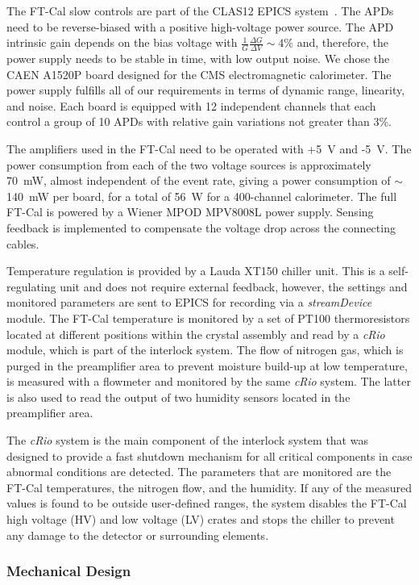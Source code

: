 The FT-Cal slow controls are part of the CLAS12 EPICS system~\cite{daq}. The APDs need to be reverse-biased
with a positive high-voltage power source. The APD intrinsic gain depends on the bias voltage with
$\frac{1}{G}\frac{\Delta G}{\Delta V} \sim4 \%$ and, therefore, the power supply needs to be stable in time, with
low output noise. We chose the CAEN A1520P board designed for the CMS electromagnetic calorimeter. The power
supply fulfills all of our requirements in terms of dynamic range, linearity, and noise. Each board is equipped with 12
independent channels that each control a group of 10 APDs with relative gain variations not greater than 3\%.

The amplifiers used in the FT-Cal need to be operated with +5~V and -5~V. The power consumption from each of the
two voltage sources is approximately 70~mW, almost independent of the event rate, giving a power consumption of
$\sim$140~mW per board, for a total of 56~W for a 400-channel calorimeter. The full FT-Cal is powered by a
Wiener MPOD MPV8008L power supply. Sensing feedback is implemented to compensate the voltage drop across the
connecting cables.

Temperature regulation is provided by a Lauda XT150 chiller unit. This is a self-regulating unit and does not require
external feedback, however, the settings and monitored parameters are sent to EPICS for recording via a
{\it streamDevice} module. The FT-Cal temperature is monitored by a set of PT100 thermoresistors located at
different positions within the crystal assembly and read by a {\it cRio} module, which is part of the interlock system.
The flow of nitrogen gas, which is purged in the preamplifier area to prevent moisture build-up at low temperature,
is measured with a flowmeter and monitored by the same {\it cRio} system. The latter is also used to read the output
of two humidity sensors located in the preamplifier area. 

The {\it cRio} system is the main component of the interlock system that was designed to provide a fast shutdown
mechanism for all critical components in case abnormal conditions are detected. The parameters that are monitored
are the FT-Cal temperatures, the nitrogen flow, and the humidity. If any of the measured values is found to be
outside user-defined ranges, the system disables the FT-Cal high voltage (HV) and low voltage (LV) crates and stops
the chiller to prevent any damage to the detector or surrounding elements.

\subsubsection{Mechanical Design}

